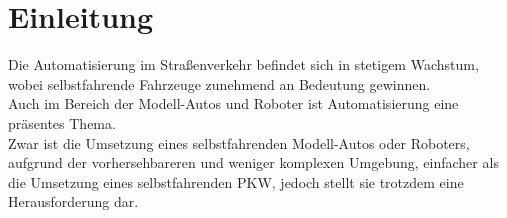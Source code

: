 \section{Einleitung}
Die Automatisierung im Straßenverkehr befindet sich in stetigem Wachstum, wobei selbstfahrende Fahrzeuge zunehmend an Bedeutung gewinnen. \\
Auch im Bereich der Modell-Autos und Roboter ist Automatisierung eine präsentes Thema. \\
Zwar ist die Umsetzung eines selbstfahrenden Modell-Autos oder Roboters, aufgrund der vorhersehbareren und weniger komplexen Umgebung, 
einfacher als die Umsetzung eines selbstfahrenden PKW, jedoch stellt sie trotzdem eine Herausforderung dar.
